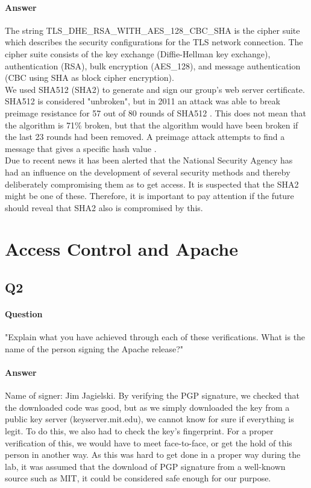 \documentclass[11pt, a4paper]{article}
\begin{document}
\paragraph{Answer}
The string TLS\_DHE\_RSA\_WITH\_AES\_128\_CBC\_SHA is the cipher suite which describes the security configurations for the TLS network connection. The cipher suite consists of the key exchange (Diffie-Hellman key exchange), authentication (RSA), bulk encryption (AES\_128), and message authentication (CBC using SHA as block cipher encryption). \\

We used SHA512 (SHA2) to generate and sign our group's web server certificate. SHA512 is considered "unbroken", but in 2011 an attack was able to break preimage resistance  for 57 out of 80 rounds of SHA512 \cite{sha512-attack}. This does not mean that the algorithm is 71\% broken, but that the algorithm would have been broken if the last 23 rounds had been removed. A preimage attack attempts to find a message that gives a specific hash value \cite{preimage-resistance}.\\

Due to recent news \cite{NSA} it has been alerted that the National Security Agency has had an influence on the development of several security methods and thereby deliberately compromising them as to get access. It is suspected that the SHA2 might be one of these. Therefore, it is important to pay attention if the future should reveal that SHA2 also is compromised by this.

\section{Access Control and Apache}
\subsection{Q2}
\paragraph{Question}
"Explain what you have achieved through each of these verifications. What is the name of the person signing the Apache release?"
\paragraph{Answer}
Name of signer: Jim Jagielski.
By verifying the PGP signature, we checked that the downloaded code was good, but as we simply downloaded the key from a public key server (keyserver.mit.edu), we cannot know for sure if everything is legit. To do this, we also had to check the key's fingerprint. For a proper verification of this, we would have to meet face-to-face, or get the hold of this person in another way. As this was hard to get done in a proper way during the lab, it was assumed that the download of PGP signature from a well-known source such as MIT, it could be considered safe enough for our purpose.
\end{document}
